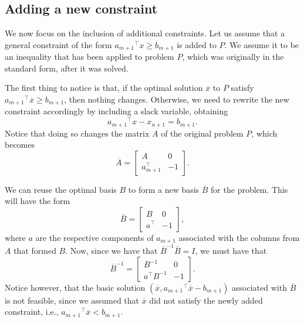 \subsection{Adding a new constraint} \label{section_612}

We now focus on the inclusion of additional constraints. Let us assume that a general constraint of the form ${a_{m+1}}^\top x \geq b_{m+1}$ is added to $P$. We assume it to be an inequality that has been applied to problem $P$, which was originally in the standard form, after it was solved.

The first thing to notice is that, if the optimal solution $\overline{x}$ to $P$ satisfy ${a_{m+1}}^\top \overline{x} \geq b_{m+1}$, then nothing changes. Otherwise, we need to rewrite the new constraint accordingly by including a slack variable, obtaining 
%
\begin{equation*}
	{a_{m+1}}^\top x - x_{n+1} = b_{m+1}.
\end{equation*}
%
Notice that doing so changes the matrix $A$ of the original problem $P$, which becomes
%
\begin{equation*}
	\overline{A} = \begin{bmatrix}
				   A & 0 \\ a^\top_{m+1} & -1 
				   \end{bmatrix}.
\end{equation*}

We can reuse the optimal basis $B$ to form a new basis $\overline{B}$ for the problem. This will have the form
%
\begin{equation*}
	\overline{B} = \begin{bmatrix}
		B & 0 \\ a^\top & -1 
	\end{bmatrix},	
\end{equation*}
%
where $a$ are the respective components of $a_{m+1}$ associated with the columns from $A$ that formed $B$. Now, since we have that $\overline{B}^{-1}\overline{B} = I$, we must have that 
%
\begin{equation*}
	\overline{B}^{-1} = \begin{bmatrix}
		B^{-1} & 0 \\ a^\top B^{-1} & -1 
	\end{bmatrix}.	
\end{equation*}
%
Notice however, that the basic solution $(\overline{x}, {a_{m+1}}^\top \overline{x} -  b_{m+1})$ associated with $\overline{B}$ is not feasible, since we assumed that $\overline{x}$ did not satisfy the newly added constraint, i.e., ${a_{m+1}}^\top \overline{x} < b_{m+1}$.


